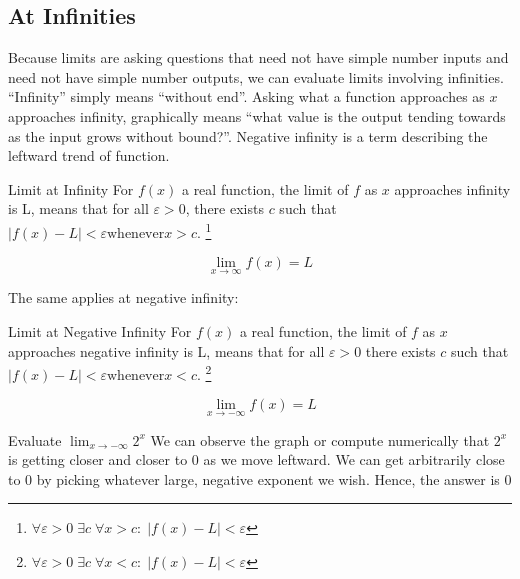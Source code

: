 
\subsection{At Infinities}


Because limits are asking questions that need not have simple number inputs and
need not have simple number outputs, we can evaluate limits involving infinities.
``Infinity'' simply means ``without end''.  Asking what a function approaches as
$x$ approaches infinity, graphically means ``what value is the output tending
towards as the input grows without bound?''.  Negative infinity is a term describing
the leftward trend of function.


\begin{derivation}{Limit at Infinity}
For $f(x)$ a real function, the limit of $f$ as $x$ approaches infinity is L, 
means that for all  $\varepsilon >0$, there exists $c$ such 
that $|f(x) - L| < \varepsilon \text{whenever} x > c$. \footnote{$\forall \varepsilon > 
0 \; \exists c \; \forall x > c :\; |f(x) - L| < \varepsilon$}

$$\lim _{x\to \infty }f(x)=L$$

\end{derivation}


The same applies at negative infinity:


\begin{derivation}{Limit at Negative Infinity}
For $f(x)$ a real function, the limit of $f$ as $x$ approaches negative infinity is L, 
means that for all $\varepsilon >0$ there exists $c$ such that 
$ |f(x) - L| < \varepsilon \text{whenever} x < c$.  \footnote{$\forall \varepsilon > 
0 \; \exists c \; \forall x < c :\; |f(x) - L| < \varepsilon$}


$$ \lim_{x \to -\infty}f(x) = L$$

\end{derivation}


\begin{example}
	\exProblem
Evaluate $\displaystyle \lim_{x \to -\infty}2^x$
	\exSolution
We can observe the graph or compute numerically that $2^x$ is getting closer
and closer to 0 as we move leftward.  We can get arbitrarily close to 0 by picking
whatever large, negative exponent we wish.  Hence, the answer is 0
\end{example}




